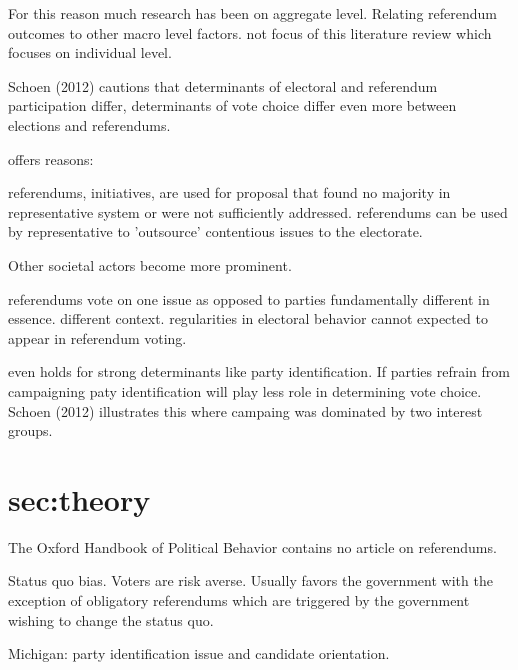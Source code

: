 \documentclass[11pt,a4paper]{article}
\begin{document}
	For this reason much research has been on aggregate level. Relating referendum outcomes to other macro level factors. not focus of this literature review which focuses on individual level.
	
	Schoen (2012) cautions that determinants of electoral and referendum participation differ, determinants of vote choice differ even more between elections and referendums. 
	
	offers reasons:
	

referendums, initiatives, are used for proposal that found no majority in representative system or were not sufficiently addressed. referendums can be used by representative to 'outsource' contentious issues to the electorate. 

Other societal actors become more prominent. 

referendums vote on one issue as opposed to parties fundamentally different in essence. different context. regularities in electoral behavior cannot expected to appear in referendum voting.

even holds for strong determinants like party identification. If parties refrain from campaigning paty identification will play less role in determining vote choice. Schoen (2012) illustrates this where campaing was dominated by two interest groups.

\section{sec:theory}

The Oxford Handbook of Political Behavior contains no article on referendums.

Status quo bias. Voters are risk averse. Usually favors the government with the exception of obligatory referendums which are triggered by the government wishing to change the status quo.

Michigan: party identification issue and candidate orientation. 
\end{document}
